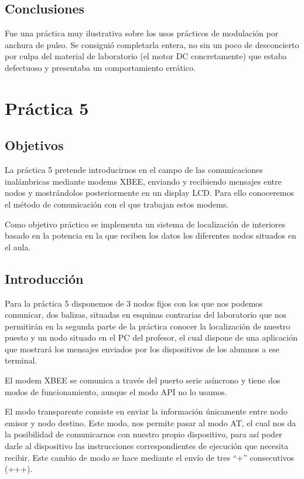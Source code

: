 \documentclass[a4paper, 11pt]{article}
\begin{document}
\subsection{Conclusiones}
Fue una práctica muy ilustrativa sobre los usos prácticos de
modulación por anchura de pulso. Se consiguió completarla entera,
no sin un poco de desconcierto por culpa del material de
laboratorio (el motor DC concretamente) que estaba defectuoso y
presentaba un comportamiento errático.


\section{Práctica 5}

\subsection{Objetivos}
La práctica 5 pretende introducirnos en el campo de las
comunicaciones inalámbricas mediante modems XBEE, enviando y
recibiendo mensajes entre nodos y mostrándolos posteriormente en un
display LCD. Para ello conoceremos el método de comunicación con el
que trabajan estos modems.

Como objetivo práctico se implementa un sistema de localización de
interiores basado en la potencia en la que reciben los datos los
diferentes nodos situados en el aula.

\subsection{Introducción}
Para la práctica 5 disponemos de 3 nodos fijos con los que nos
podemos comunicar, dos balizas, situadas en esquinas contrarias del
laboratorio que nos permitirán en la segunda parte de la práctica
conocer la localización de nuestro puesto y un nodo situado en el
PC del profesor, el cual dispone de una aplicación que mostrará los
mensajes enviados por los dispositivos de los alumnos a ese
terminal.

El modem XBEE se comunica a través del puerto serie asíncrono y
tiene dos modos de funcionamiento, aunque el modo API no lo usamos.

El modo transparente consiste en enviar la información únicamente
entre nodo emisor y nodo destino. Este modo, nos permite pasar al
modo AT, el cual nos da la posibilidad de comunicarnos con nuestro
propio dispositivo, para así poder darle al dispositivo las
instrucciones correspondientes de ejecución que necesita recibir.
Este cambio de modo se hace mediante el envío de tres ``+''
consecutivos (+++).
\end{document}
